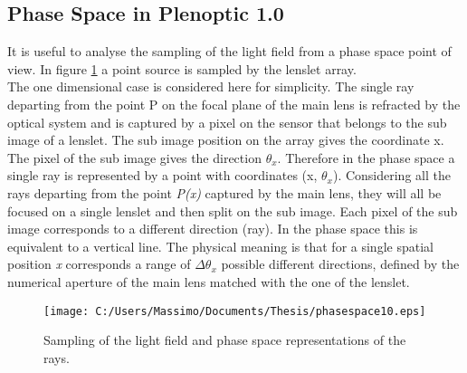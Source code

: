\subsection{Phase Space in Plenoptic 1.0}
\label{sec:phase_space}
It is useful to analyse the sampling of the light field from a phase space point of view. In figure \ref{fig:plenoptic6} a point source is sampled by the lenslet array.\\
 The one dimensional case is considered here for simplicity. The single ray departing from the point P on the focal plane of the main lens is refracted by the optical system and is captured by a pixel on the sensor that belongs to the sub image of a lenslet. The sub image position on the array gives the coordinate x. The pixel of the sub image gives the direction $\theta_x$. Therefore in the phase space a single ray is represented by a point with coordinates (x, $\theta_x$).
Considering all the rays departing from the point \textit{P(x)} captured by the main lens, they will all be focused on a single lenslet and then split on the sub image. Each pixel of the sub image corresponds to a different direction (ray). In the phase space this is equivalent to a vertical line. The physical meaning is that for a single spatial position \textit{x} corresponds a range of $\Delta \theta_x$ possible different directions, defined by the numerical aperture of the main lens matched with the one of the lenslet.\\
\newpage
\begin{figure}[H]
	\centering
	\texttt{[image: C:/Users/Massimo/Documents/Thesis/phasespace10.eps]}
	\caption{\label{fig:plenoptic6}Sampling of the light field and phase space representations of the rays.  }
\end{figure}
\newpage
